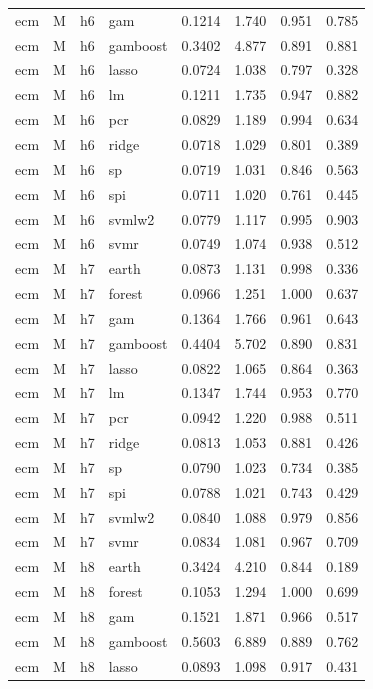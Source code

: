 \begin{ThreePartTable}
\begin{longtable}[t]{llclcccc}
ecm & M & h6 & gam & 0.1214 & 1.740 & 0.951 & 0.785\\
ecm & M & h6 & gamboost & 0.3402 & 4.877 & 0.891 & 0.881\\
ecm & M & h6 & lasso & 0.0724 & 1.038 & 0.797 & 0.328\\
ecm & M & h6 & lm & 0.1211 & 1.735 & 0.947 & 0.882\\
ecm & M & h6 & pcr & 0.0829 & 1.189 & 0.994 & 0.634\\
ecm & M & h6 & ridge & 0.0718 & 1.029 & 0.801 & 0.389\\
ecm & M & h6 & sp & 0.0719 & 1.031 & 0.846 & 0.563\\
ecm & M & h6 & spi & 0.0711 & 1.020 & 0.761 & 0.445\\
ecm & M & h6 & svmlw2 & 0.0779 & 1.117 & 0.995 & 0.903\\
ecm & M & h6 & svmr & 0.0749 & 1.074 & 0.938 & 0.512\\
\addlinespace
ecm & M & h7 & earth & 0.0873 & 1.131 & 0.998 & 0.336\\
ecm & M & h7 & forest & 0.0966 & 1.251 & 1.000 & 0.637\\
ecm & M & h7 & gam & 0.1364 & 1.766 & 0.961 & 0.643\\
ecm & M & h7 & gamboost & 0.4404 & 5.702 & 0.890 & 0.831\\
ecm & M & h7 & lasso & 0.0822 & 1.065 & 0.864 & 0.363\\
ecm & M & h7 & lm & 0.1347 & 1.744 & 0.953 & 0.770\\
ecm & M & h7 & pcr & 0.0942 & 1.220 & 0.988 & 0.511\\
ecm & M & h7 & ridge & 0.0813 & 1.053 & 0.881 & 0.426\\
ecm & M & h7 & sp & 0.0790 & 1.023 & 0.734 & 0.385\\
ecm & M & h7 & spi & 0.0788 & 1.021 & 0.743 & 0.429\\
ecm & M & h7 & svmlw2 & 0.0840 & 1.088 & 0.979 & 0.856\\
ecm & M & h7 & svmr & 0.0834 & 1.081 & 0.967 & 0.709\\
\addlinespace
ecm & M & h8 & earth & 0.3424 & 4.210 & 0.844 & 0.189\\
ecm & M & h8 & forest & 0.1053 & 1.294 & 1.000 & 0.699\\
ecm & M & h8 & gam & 0.1521 & 1.871 & 0.966 & 0.517\\
ecm & M & h8 & gamboost & 0.5603 & 6.889 & 0.889 & 0.762\\
ecm & M & h8 & lasso & 0.0893 & 1.098 & 0.917 & 0.431\\

\end{longtable}
\end{ThreePartTable}
